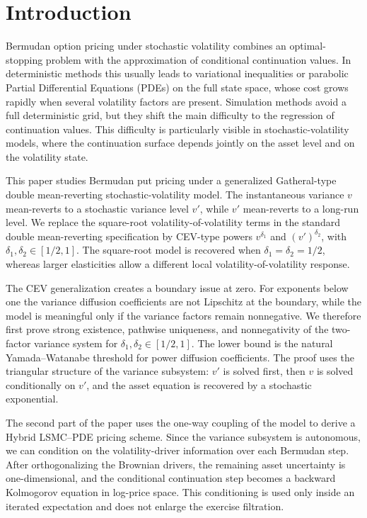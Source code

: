 \documentclass[pdflatex,sn-mathphys-num]{sn-jnl}
\theoremstyle{thmstyleone}%
\theoremstyle{thmstylethree}%
\theoremstyle{thmstyletwo}%
\begin{document}
\section{Introduction}

Bermudan option pricing under stochastic volatility combines an optimal-stopping
problem with the approximation of conditional continuation values. In deterministic
methods this usually leads to variational inequalities or parabolic
Partial Differential Equations (PDEs) on the full state space, whose cost grows
rapidly when several volatility factors are present.
Simulation methods avoid a full deterministic grid, but they shift the main difficulty
to the regression of continuation values. This difficulty is particularly visible in
stochastic-volatility models, where the continuation surface depends jointly on the
asset level and on the volatility state.

This paper studies Bermudan put pricing under a generalized Gatheral-type double
mean-reverting stochastic-volatility model. The instantaneous variance \(v\)
mean-reverts to a stochastic variance level \(v'\), while \(v'\) mean-reverts to a
long-run level. We replace the square-root volatility-of-volatility terms in the
standard double mean-reverting specification by CEV-type powers \(v^{\delta_1}\)
and \((v')^{\delta_2}\), with \(\delta_1,\delta_2\in[1/2,1]\). The square-root
model is recovered when \(\delta_1=\delta_2=1/2\), whereas larger elasticities
allow a different local volatility-of-volatility response.

The CEV generalization creates a boundary issue at zero. For exponents below one
the variance diffusion coefficients are not Lipschitz at the boundary, while the
model is meaningful only if the variance factors remain nonnegative. We therefore
first prove strong existence, pathwise uniqueness, and nonnegativity of the
two-factor variance system for \(\delta_1,\delta_2\in[1/2,1]\). The lower bound
is the natural Yamada--Watanabe threshold for power diffusion coefficients. The
proof uses the triangular structure of the variance subsystem: \(v'\) is solved
first, then \(v\) is solved conditionally on \(v'\), and the asset equation is
recovered by a stochastic exponential.

The second part of the paper uses the one-way coupling of the model to derive a
Hybrid LSMC--PDE pricing scheme. Since the variance subsystem is autonomous, we
can condition on the volatility-driver information over each Bermudan step.
After orthogonalizing the Brownian drivers, the remaining asset uncertainty is
one-dimensional, and the conditional continuation step becomes a backward
Kolmogorov equation in log-price space. This conditioning is used only inside an
iterated expectation and does not enlarge the exercise filtration.
\end{document}
